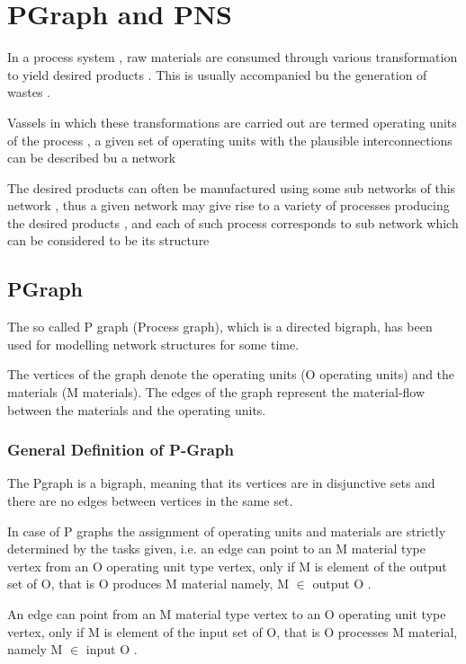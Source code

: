 
\chapter{\label{cha:pgraph}PGraph and PNS}

 
In a process system , raw materials are consumed through various transformation to yield desired products . 
This is usually accompanied bu the generation of wastes .

Vassels in which these transformations are carried out are termed operating units of the process , 
a given set of operating units with the plausible interconnections can be described bu a network 

The desired products can often be manufactured using some sub networks of this network , 
thus a given network may give rise to a variety of processes producing the desired products , 
and each of such process corresponds to sub network which can be considered  to be its structure  \cite{omacs0}
\section{ PGraph }


The so called P graph (Process graph), which is a directed bigraph, 
has been used for modelling network structures for some time.

The vertices of the graph denote the operating units (O   operating units) and the materials (M   materials).
The edges of the graph represent the material-flow between the materials and the operating units. \cite{pns2}\cite{pns4}

\subsection{ General Definition of P-Graph }

The Pgraph is a bigraph, meaning that its vertices are in disjunctive sets 
and there are no edges between vertices in the same set.

In case of P graphs the assignment of operating units and materials are strictly 
determined by the tasks given, i.e. an edge can point to an M material type vertex 
from an O operating unit type vertex, only if M is element of the output set of O, 
that is O produces M material namely, M $\in$ output O . \cite{pns2}



An edge can point from an M material type vertex to an O operating unit type vertex, 
only if M is element of the input set of O, that is O processes M material, namely M  $\in$ input O . 

